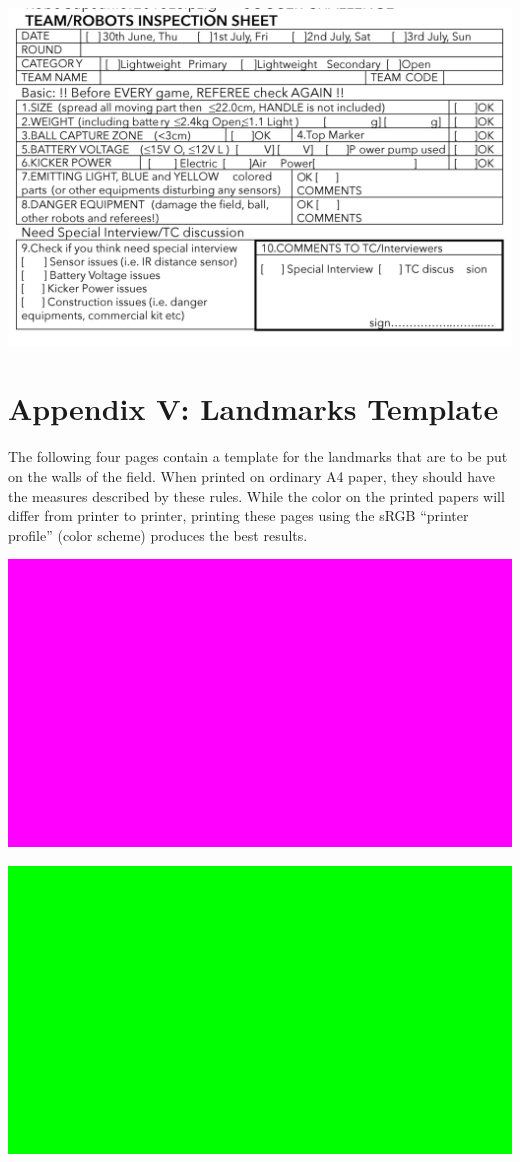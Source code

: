 \documentclass{article}
\begin{document}
\includegraphics[width=1\textwidth]{media/image10.png}

\section{\textcolor{color-5}{Appendix V: Landmarks Template}\label{ref-066}}

\textcolor{color-5}{The following four pages contain a template for the landmarks that are to be put on the walls of the field. When printed on ordinary A4 paper, they should have the measures described by these rules. While the color on the printed papers will differ from printer to printer, printing these pages using the sRGB ``printer profile'' (color scheme) produces the best results.}

\includegraphics[width=1\textwidth]{media/image11.png}

\includegraphics[width=1\textwidth]{media/image12.png}
\end{document}
